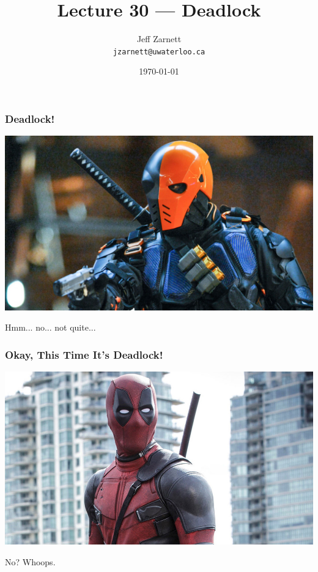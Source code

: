 

\title{Lecture 30 --- Deadlock }

\author{Jeff Zarnett \\ \small \texttt{jzarnett@uwaterloo.ca}}
\date{\today}




\begin{frame}
	\titlepage

\end{frame}


\begin{frame}
	\frametitle{Deadlock!}

	\begin{center}
		\includegraphics[width=\textwidth]{images/deathstroke.jpg}
	\end{center}

	Hmm... no... not quite...

\end{frame}


\begin{frame}
	\frametitle{Okay, This Time It's Deadlock!}

	\begin{center}
		\includegraphics[width=\textwidth]{images/deadpool.jpg}
	\end{center}

	No? Whoops.

\end{frame}


